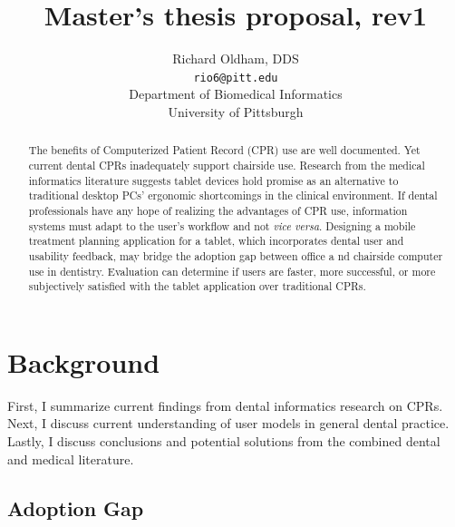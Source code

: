 \documentclass[11pt]{article}
\begin{document}
\title{Master's thesis proposal, rev1}
\author{Richard Oldham, DDS\\
		\texttt{rio6@pitt.edu}\\
		Department of Biomedical Informatics\\
		University of Pittsburgh}
\maketitle

\begin{abstract}
The benefits of Computerized Patient Record (CPR) use are well documented. Yet current dental CPRs inadequately support chairside use. Research from the medical informatics literature suggests tablet devices hold promise as an alternative to traditional desktop PCs' ergonomic shortcomings in the clinical environment. If dental professionals have any hope of realizing the advantages of CPR use, information systems must adapt to the user's workflow and not \emph{vice versa}. Designing a mobile treatment planning application for a tablet, which incorporates dental user and usability feedback, may bridge the adoption gap between office a	nd chairside computer use in dentistry. Evaluation can determine if users are faster, more successful, or more subjectively satisfied with the tablet application over traditional CPRs.
\end{abstract}
\tableofcontents
\newpage

\section{Background}
First, I summarize current findings from dental informatics research on CPRs. Next, I discuss current understanding of user models in general dental practice. Lastly, I discuss conclusions and potential solutions from the combined dental and medical literature.

\subsection{Adoption Gap}
\label{Adoption Gap}
\end{document}
